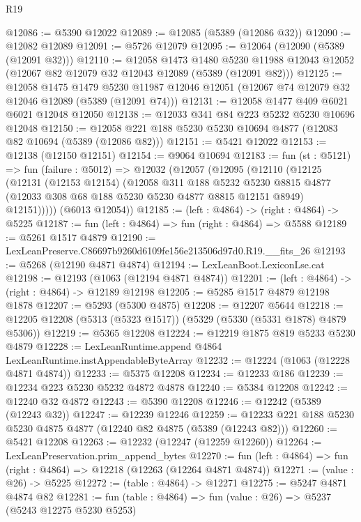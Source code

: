 \begin{lexlean}{R19}
\begin{coremodule}
@12086 := @5390 @12022
@12089 := @12085 (@5389 (@12086 @32))
@12090 := @12082 @12089
@12091 := @5726 @12079
@12095 := @12064 (@12090 (@5389 (@12091 @32)))
@12110 := @12058
    @1473
    @1480
    @5230
    @11988
    @12043
    @12052
    (@12067 @82 @12079 @32 @12043 @12089 (@5389 (@12091 @82)))
@12125 := @12058
    @1475
    @1479
    @5230
    @11987
    @12046
    @12051
    (@12067 @74 @12079 @32 @12046 @12089 (@5389 (@12091 @74)))
@12131 := @12058 @1477 @409 @6021 @6021 @12048 @12050
@12138 := @12033 @341 @84 @223 @5232 @5230 @10696 @12048
@12150 := @12058 @221 @188 @5230 @5230 @10694 @4877 (@12083 @82 @10694 (@5389 (@12086 @82)))
@12151 := @5421 @12022
@12153 := @12138 (@12150 @12151)
@12154 := @9064 @10694
@12183 := fun (st : @5121) =>
  fun (failure : @5012) =>
  @12032
    (@12057
      (@12095
        (@12110
          (@12125
            (@12131
              (@12153 @12154)
              (@12058
                @311
                @188
                @5232
                @5230
                @8815
                @4877
                (@12033 @308 @68 @188 @5230 @5230 @4877 @8815 @12151 @8949)
                @12151)))))
      (@6013 @12054))
@12185 := (left : @4864) -> (right : @4864) -> @5225
@12187 := fun (left : @4864) => fun (right : @4864) => @5588
@12189 := @5261 @1517 @4879
@12190 := LexLeanPreserve.C86697b9260d6109fe156e213506d97d0.R19.__fits_26
@12193 := @5268 (@12190 @4871 @4874)
@12194 := LexLeanBoot.LexiconLse.cat
@12198 := @12193 (@1063 (@12194 @4871 @4874))
@12201 := (left : @4864) -> (right : @4864) -> @12189 @12198
@12205 := @5285 @1517 @4879 @12198 @1878
@12207 := @5293 (@5300 @4875)
@12208 := @12207 @5644
@12218 := @12205 @12208 (@5313 (@5323 @1517)) (@5329 (@5330 (@5331 @1878) @4879 @5306))
@12219 := @5365 @12208
@12224 := @12219 @1875 @819 @5233 @5230 @4879
@12228 := LexLeanRuntime.append @4864 LexLeanRuntime.instAppendableByteArray
@12232 := @12224 (@1063 (@12228 @4871 @4874))
@12233 := @5375 @12208
@12234 := @12233 @186
@12239 := @12234 @223 @5230 @5232 @4872 @4878
@12240 := @5384 @12208
@12242 := @12240 @32 @4872
@12243 := @5390 @12208
@12246 := @12242 (@5389 (@12243 @32))
@12247 := @12239 @12246
@12259 := @12233 @221 @188 @5230 @5230 @4875 @4877 (@12240 @82 @4875 (@5389 (@12243 @82)))
@12260 := @5421 @12208
@12263 := @12232 (@12247 (@12259 @12260))
@12264 := LexLeanPreservation.prim_append_bytes
@12270 := fun (left : @4864) => fun (right : @4864) => @12218 (@12263 (@12264 @4871 @4874))
@12271 := (value : @26) -> @5225
@12272 := (table : @4864) -> @12271
@12275 := @5247 @4871 @4874 @82
@12281 := fun (table : @4864) => fun (value : @26) => @5237 (@5243 @12275 @5230 @5253)

\end{coremodule}
\end{lexlean}
